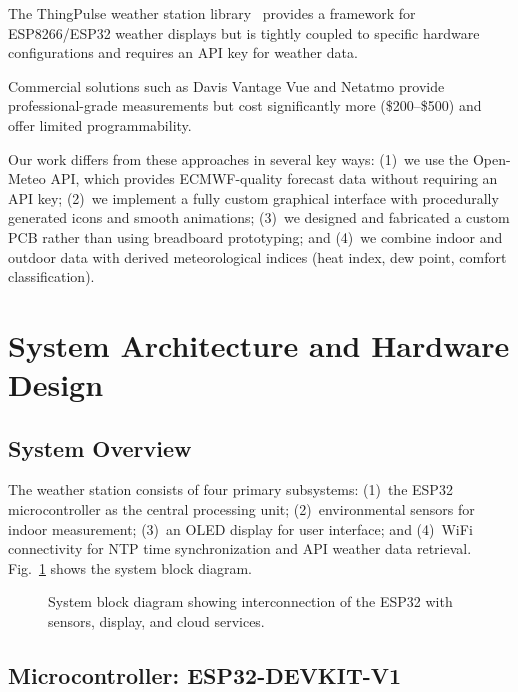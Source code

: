 \documentclass[conference]{IEEEtran}
\begin{document}
The ThingPulse weather station library~\cite{thingpulse} provides a framework for ESP8266/ESP32 weather displays but is tightly coupled to specific hardware configurations and requires an API key for weather data.

Commercial solutions such as Davis Vantage Vue and Netatmo provide professional-grade measurements but cost significantly more (\$200--\$500) and offer limited programmability.

Our work differs from these approaches in several key ways: (1)~we use the Open-Meteo API, which provides ECMWF-quality forecast data without requiring an API key; (2)~we implement a fully custom graphical interface with procedurally generated icons and smooth animations; (3)~we designed and fabricated a custom PCB rather than using breadboard prototyping; and (4)~we combine indoor and outdoor data with derived meteorological indices (heat index, dew point, comfort classification).

\section{System Architecture and Hardware Design}

\subsection{System Overview}

The weather station consists of four primary subsystems: (1)~the ESP32 microcontroller as the central processing unit; (2)~environmental sensors for indoor measurement; (3)~an OLED display for user interface; and (4)~WiFi connectivity for NTP time synchronization and API weather data retrieval. Fig.~\ref{fig:block_diagram} shows the system block diagram.

\begin{figure}[h]
    \centering
    \caption{System block diagram showing interconnection of the ESP32 with sensors, display, and cloud services.}
    \label{fig:block_diagram}
\end{figure}

\subsection{Microcontroller: ESP32-DEVKIT-V1}
\end{document}
